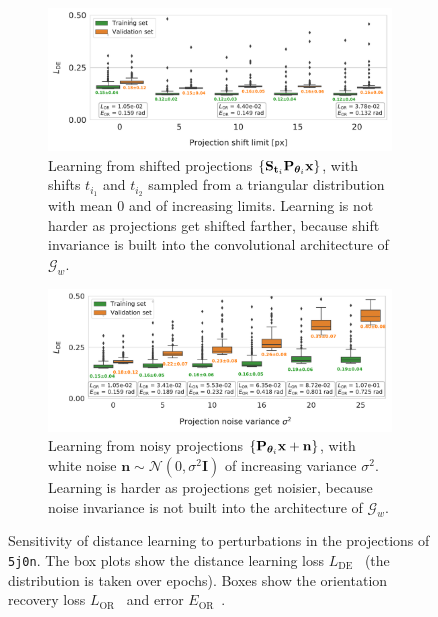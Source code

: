 \begin{figure}[ht!]
    \centering
    \begin{subfigure}[t]{0.47\linewidth}
        \includegraphics[width=\linewidth]{figures/de_translation_nums}
        \caption{%
            Learning from shifted projections $\{ \mathbf{S}_{\mathbf{t}_i} \mathbf{P}_{{\boldsymbol{\theta}}_i} \mathbf{x} \}$, with shifts $t_{i_1}$ and $t_{i_2}$ sampled from a triangular distribution with mean 0 and of increasing limits.
            Learning is not harder as projections get shifted farther, because shift invariance is built into the convolutional architecture of $\mathcal{G}_w$.
    }\label{fig:results:distance-estimation:shift}
    \end{subfigure}
    \hfill
    \begin{subfigure}[t]{0.47\linewidth}
        \includegraphics[width=\linewidth]{figures/de_noises_nums}
        \caption{%
            Learning from noisy projections $\{ \mathbf{P}_{{\boldsymbol{\theta}}_i} \mathbf{x} + \mathbf{n} \}$, with white noise $\mathbf{n} \sim \mathcal{N}(0, \sigma^2\mathbf{I})$ of increasing variance $\sigma^2$.
            Learning is harder as projections get noisier, because noise invariance is not built into the architecture of $\mathcal{G}_w$.
        }\label{fig:results:distance-estimation:noise}
    \end{subfigure}
    \caption{%
        Sensitivity of distance learning to perturbations in the projections of \texttt{5j0n}.
        The box plots show the distance learning loss $L_\text{DE}$~ (the distribution is taken over epochs).
        Boxes show the orientation recovery loss $L_\text{OR}$~ and error $E_\text{OR}$~.
    }
\end{figure}

